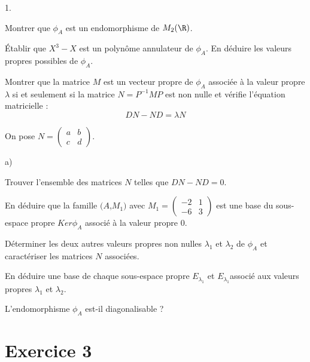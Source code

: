 \documentclass[11pt]{article}%
\begin{document}
\begin{noliste}{1.}
 \setlength{\itemsep}{4mm}
\item Montrer que $\phi_{A}$ est un endomorphisme de $M_{2}(\R)$.

\item Établir que $X^{3}-X$ est un polyn\^{o}me annulateur de
$\phi_{A}$. En déduire les valeurs propres possibles de $\phi_{A}$.

\item Montrer que la matrice $M$ est un vecteur propre de $\phi_{A}$
associée à la valeur propre $\lambda $ si et seulement si la matrice $N
= P^{-1}MP$ est non nulle et vérifie l'équation matricielle : 
\[
DN-ND = \lambda N
\]

\item On pose $N = \left( 
\begin{array}{cc}
a & b \\
c & d
\end{array}
\right).$

\begin{noliste}{a)}
 \setlength{\itemsep}{2mm}
\item Trouver l'ensemble des matrices $N$ telles que $DN-ND = 0$.

\item En déduire que la famille $(A$,$M_{1})$ avec $M_{1} = \left( 
\begin{array}{cc}
-2 & 1 \\
-6 & 3
\end{array}
\right) $ est une base du sous-espace propre $Ker\phi_{A}$ associé à
la valeur propre $0$.

\item Déterminer les deux autres valeurs propres non nulles
$\lambda_{1}$
et $\lambda_{2}$ de $\phi_{A}$ et \\
caractériser les matrices $N$ associées.

\item En déduire une base de chaque sous-espace propre
$E_{\lambda_{1}}$
et $E_{\lambda_{1}}$associé aux valeurs propres $\lambda_{1}$ et
$\lambda
_{2}. $
\end{noliste}

\item L'endomorphisme $\phi_{A}$ est-il diagonalisable ?
\end{noliste}

\section*{Exercice 3}
\end{document}
